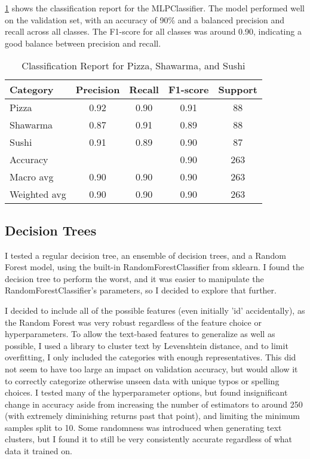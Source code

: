 \begin{itemize}
\ref{tab:nn_classification_report} shows the classification report for the MLPClassifier.
The model performed well on the validation set, with an accuracy of 90\% and a balanced precision and recall across all classes.
The F1-score for all classes was around 0.90, indicating a good balance between precision and recall.

\begin{table}[ht]
    \centering
    \begin{tabular}{lcccc}
        \hline
        Category    & Precision & Recall & F1-score & Support \\ 
        \hline
        Pizza       & 0.92      & 0.90   & 0.91     & 88      \\
        Shawarma    & 0.87      & 0.91   & 0.89     & 88      \\
        Sushi       & 0.91      & 0.89   & 0.90     & 87      \\
        \hline
        Accuracy    &           &        & 0.90     & 263     \\
        Macro avg   & 0.90      & 0.90   & 0.90     & 263     \\
        Weighted avg & 0.90     & 0.90   & 0.90     & 263     \\
        \hline
    \end{tabular}
    \caption{Classification Report for Pizza, Shawarma, and Sushi}
    \label{tab:nn_classification_report}
\end{table}


\subsection{Decision Trees}
I tested a regular decision tree, an ensemble of decision trees, and a Random Forest model, using the built-in RandomForestClassifier from sklearn. I found the decision tree to perform the worst, and it was easier to manipulate the RandomForestClassifier’s parameters, so I decided to explore that further.

I decided to include all of the possible features (even initially 'id' accidentally), as the Random Forest was very robust regardless of the feature choice or hyperparameters. To allow the text-based features to generalize as well as possible, I used a library to cluster text by Levenshtein distance, and to limit overfitting, I only included the categories with enough representatives. This did not seem to have too large an impact on validation accuracy, but would allow it to correctly categorize otherwise unseen data with unique typos or spelling choices.
I tested many of the hyperparameter options, but found insignificant change in accuracy aside from increasing the number of estimators to around 250 (with extremely diminishing returns past that point), and limiting the minimum samples split to 10. Some randomness was introduced when generating text clusters, but I found it to still be very consistently accurate regardless of what data it trained on.


\end{itemize}
